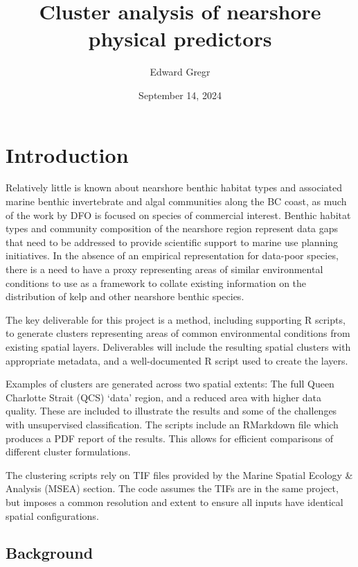 \documentclass[
  11pt,
]{article}
\title{Cluster analysis of nearshore physical predictors}
\author{Edward Gregr}
\date{September 14, 2024}
\begin{document}
\maketitle

{
\setcounter{tocdepth}{2}
\tableofcontents
}
\listoffigures

\listoftables
\newpage

\hypertarget{introduction}{%
\section{Introduction}\label{introduction}}

Relatively little is known about nearshore benthic habitat types and
associated marine benthic invertebrate and algal communities along the
BC coast, as much of the work by DFO is focused on species of commercial
interest. Benthic habitat types and community composition of the
nearshore region represent data gaps that need to be addressed to
provide scientific support to marine use planning initiatives. In the
absence of an empirical representation for data-poor species, there is a
need to have a proxy representing areas of similar environmental
conditions to use as a framework to collate existing information on the
distribution of kelp and other nearshore benthic species.

The key deliverable for this project is a method, including supporting R
scripts, to generate clusters representing areas of common environmental
conditions from existing spatial layers. Deliverables will include the
resulting spatial clusters with appropriate metadata, and a
well-documented R script used to create the layers.

Examples of clusters are generated across two spatial extents: The full
Queen Charlotte Strait (QCS) `data' region, and a reduced area with
higher data quality. These are included to illustrate the results and
some of the challenges with unsupervised classification. The scripts
include an RMarkdown file which produces a PDF report of the results.
This allows for efficient comparisons of different cluster formulations.

The clustering scripts rely on TIF files provided by the Marine Spatial
Ecology \& Analysis (MSEA) section. The code assumes the TIFs are in the
same project, but imposes a common resolution and extent to ensure all
inputs have identical spatial configurations.

\hypertarget{background}{%
\subsection{Background}\label{background}}
\end{document}
